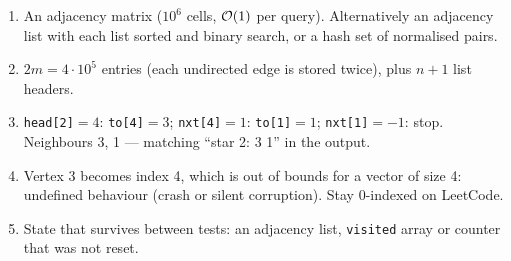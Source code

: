 \begin{solutionbox}[Answers]
\begin{enumerate}[leftmargin=*]
    \item An adjacency matrix ($10^6$ cells, $\mathcal{O}(1)$ per query). Alternatively an adjacency list with each list sorted and binary search, or a hash set of normalised pairs.
    \item $2m = 4\cdot10^5$ entries (each undirected edge is stored twice), plus $n+1$ list headers.
    \item \texttt{head[2]}$=4$: \texttt{to[4]}$=3$; \texttt{nxt[4]}$=1$: \texttt{to[1]}$=1$; \texttt{nxt[1]}$=-1$: stop. Neighbours 3, 1 --- matching ``star 2: 3 1'' in the output.
    \item Vertex 3 becomes index 4, which is out of bounds for a vector of size 4: undefined behaviour (crash or silent corruption). Stay 0-indexed on LeetCode.
    \item State that survives between tests: an adjacency list, \texttt{visited} array or counter that was not reset.
\end{enumerate}
\end{solutionbox}
